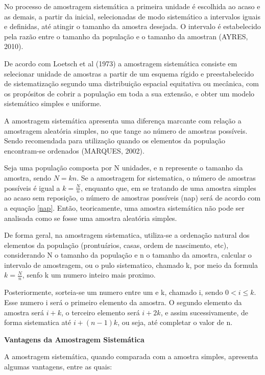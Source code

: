 No processo de amostragem sistemática a primeira unidade é escolhida ao acaso e as demais, a partir da inicial, selecionadas de modo sistemático a intervalos iguais e definidas, até atingir o tamanho da amostra desejada. O intervalo é estabelecido pela razão entre o tamanho da população e o tamanho da amostran (AYRES, 2010).\vskip0.3cm

De acordo com Loetsch et al (1973) a amostragem sistemática consiste em selecionar unidade de amostras a partir
de um esquema rígido e preestabelecido de sistematização segundo uma distribuição espacial equitativa ou mecânica, com os propósitos de cobrir a população em toda a sua extensão, e obter um modelo sistemático simples e uniforme.\vskip0.3cm


A amostragem sistemática apresenta uma diferença marcante com relação a amostragem aleatória simples, no que tange
ao número de amostras possíveis. Sendo recomendada para utilização quando os elementos da população encontram-se
ordenados (MARQUES, 2002).\vskip0.3cm



Seja uma população composta por N unidades, e n represente o tamanho da amostra, sendo $N=kn$. Se a amostragem for sistematica, o número de amostras possíveis é igual a $k=\frac{N}{n}$, enquanto que, em se tratando de uma amostra simples ao acaso sem reposição, o número de amostras possíveis (nap) será de acordo com a equação \ref{nap}. Então, teoricamente, uma amostra sistemática não pode ser analisada como se fosse uma amostra aleatória simples. \vskip0.3cm



De forma geral, na amostragem sistematica, utiliza-se a ordenação
natural dos elementos da população (prontuários, casas, ordem de
nascimento, etc), considerando N o tamanho da população e n o
tamanho da amostra, calcular o intervalo de amostragem, ou o pulo
sistematico, chamado k, por meio da formula $k=\frac{N}{n}$, senfo
k um numero inteiro mais proximo.\vskip0.3cm

Posteriormente, sorteia-se um numero entre um e k, chamado i,
sendo $0 < i \leq k$. Esse numero i será o primeiro elemento da
amostra. O segundo elemento da amostra será $i+k$, o terceiro
elemento será $i+2k$, e assim sucessivamente, de forma sistematica
até $i+(n-1)k$, ou seja, até completar o valor de n.

\vskip0.3cm


\textbf{Vantagens da Amostragem Sistemática}
\vskip0.3cm

A amostragem sistemática, quando comparada com a amostra simples, apresenta algumas vantagens, entre as quais:



